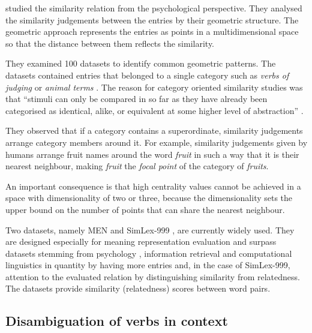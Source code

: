  studied the similarity relation from the psychological perspective. They analysed the similarity judgements between the entries by their geometric structure. The geometric approach represents the entries as points in a multidimensional space so that the distance between them reflects the similarity.

They examined 100 datasets to identify common geometric patterns. The datasets contained entries that belonged to a single category such as \textit{verbs of judging} \cite{FILLENBAUM197454} or \textit{animal terms} \cite{HENLEY1969176}. The reason for category oriented similarity studies was that ``stimuli can only be compared in so far as they have already been categorised as identical, alike, or equivalent at some higher level of abstraction'' \cite{turner1987rediscovering}.

They observed that if a category contains a superordinate, similarity judgements arrange category members around it. For example, similarity judgements given by humans arrange fruit names around the word \textit{fruit} in such a way that it is their nearest neighbour, making \textit{fruit} the \emph{focal point} of the category of \textit{fruits}.

An important consequence is that high centrality values cannot be achieved in a space with dimensionality of two or three,  because the dimensionality sets the upper bound on the number of points that can share the nearest neighbour.

Two datasets, namely MEN \cite{Bruni:2012:DST:2390524.2390544} and SimLex-999 \cite{hill2014simlex}, are currently widely used. They are designed especially for meaning representation evaluation and surpass datasets stemming from psychology \cite{1986-13502-00119860101}, information retrieval \cite{2002:PSC:503104.503110} and computational linguistics \cite{Rubenstein:1965:CCS:365628.365657} in quantity by having more entries and, in the case of SimLex-999, attention to the evaluated relation by distinguishing similarity from relatedness. The datasets provide similarity (relatedness) scores between word pairs.
%
%
%

\subsection{Disambiguation of verbs in context}
\label{sec:disamb}


